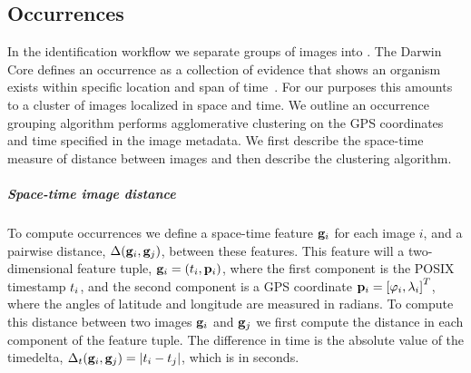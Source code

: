 \begin{comment}
fixtex --fpaths appendix.tex --outline --asmarkdown --numlines=999 --shortcite -w && ./checklang.py outline_appendix.md
\end{comment}

\begin{appendices}

\chapter{Occurrences}\label{app:occurgroup}

    In the identification workflow we separate groups of images into .
    The Darwin Core defines an occurrence as a collection of evidence that shows an organism exists within
      specific location and span of time~\cite{wieczorek_darwin_2012}.
    For our purposes this amounts to a cluster of images localized in space and time.
    We outline an occurrence grouping algorithm performs agglomerative clustering on the GPS coordinates and time
      specified in the image metadata.
    We first describe the space-time measure of distance between images and then describe the clustering
      algorithm.

    \paragraph{Space-time image distance}
    To compute occurrences we define a space-time feature $\mathbf{g}_i$ for each image $i$, and a pairwise distance,
      $\Delta(\mathbf{g}_i, \mathbf{g}_j)$, between these features.
    This feature will a two-dimensional feature tuple, %
    $\mathbf{g}_i = \left(t_i, \mathbf{p}_i\right)$, where the first component is the POSIX timestamp $t_i$, and the second
      component is a GPS coordinate %
    $\mathbf{p}_i = \left[\varphi_i, \lambda_i\right]^{T}$, where the angles of latitude and longitude are measured in radians.
    To compute this distance between two images $\mathbf{g}_i$ and $\mathbf{g}_j$ we first compute the distance in each component
      of the feature tuple.
    The difference in time is the absolute value of the timedelta,  %
    $\Delta_t(\mathbf{g}_i, \mathbf{g}_j) = |t_i - t_j|$, which is in seconds.


\end{appendices}
